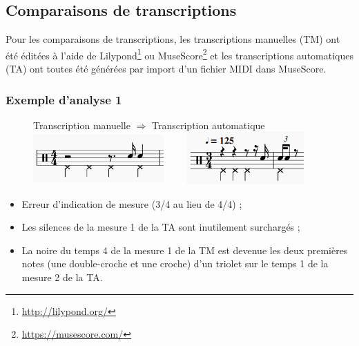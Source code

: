 \subsection*{Comparaisons de transcriptions}
Pour les comparaisons de transcriptions, les transcriptions manuelles (TM) ont
été éditées à l’aide de Lilypond\footnote{\url{http://lilypond.org/}} ou
MuseScore\footnote{\url{https://musescore.com/}} et les transcriptions
automatiques (TA) ont toutes été générées par import d’un fichier MIDI dans
MuseScore.

\subsubsection{Exemple d’analyse 1}
\begin{figure}[h]
\centering
Transcription manuelle $\Rightarrow$ Transcription automatique
\includegraphics[height=20mm, width=50mm]{
z_images/4_experimentations/1_analyses/0_drummer1_session3/1_manuelle.png}
\ \ \ \ 
\includegraphics[height=20mm, width=45mm]{
z_images/4_experimentations/1_analyses/0_drummer1_session3/0_musescore.png}
\end{figure}
\begin{itemize}
	\item Erreur d’indication de mesure (3/4 au lieu de 4/4) ;
	\item Les silences de la mesure 1 de la TA sont inutilement surchargés ;
	\item La noire du temps 4 de la mesure 1 de la TM est devenue les deux
        premières notes (une double-croche et une croche) d’un triolet sur le
        temps 1 de la mesure 2 de la TA.
\end{itemize}

